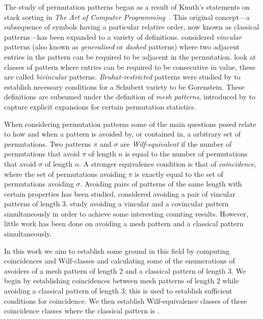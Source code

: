 The study of permutation patterns began as a result of Knuth's statements on
stack sorting in \emph{The Art of Computer Programming}~\cite[p.~243,
Ex.~5,6]{Knuth:1997:ACP:260999}. This original concept---a subsequence of
symbols having a particular relative order, now known as classical
patterns---has been expanded to a variety of definitions.
\textcite{babstein2000} considered \emph{vincular} patterns (also known as
\emph{generalised} or \emph{dashed} patterns) where two adjacent entries in the
pattern can be required to be adjacent in the permutation. \textcite{MR2652101}
look at classes of pattern where entries can be required to be consecutive in
value, these are called \emph{bivincular} patterns. \emph{Bruhat-restricted}
patterns were studied by \textcite{MR2264071} to establish necessary conditions
for a Schubert variety to be Gorenstein. These definitions are subsumed under
the definition of \emph{mesh patterns}, introduced by
\textcite{journals/combinatorics/BrandenC11} to capture explicit expansions for
certain permutation statistics.

When considering permutation patterns some of the main questions posed relate to
how and when a pattern is avoided by, or contained in, a arbitrary set of
permutations. Two patterns \(\pi\) and \(\sigma\) are \emph{Wilf-equivalent} if
the number of permutations that avoid \(\pi\) of length \(n\) is equal to the
number of permutations that avoid \(\sigma\) of length \(n\). A stronger
equivalence condition is that of \emph{coincidence}, where the set of
permutations avoiding \(\pi\) is exactly equal to the set of permutations
avoiding \(\sigma\). Avoiding pairs of patterns of the same length with certain
properties has been studied, \textcite{MR2178749} considered avoiding
a pair of vincular patterns of length 3. \textcite{2015arXiv151203226B} study
avoiding a vincular and a covincular pattern simultaneously in order to achieve
some interesting counting results. However, little work has been done on
avoiding a mesh pattern and a classical pattern simultaneously.

In this work we aim to establish some ground in this field by computing
coincidences and Wilf-classes and calculating some of the enumerations of
avoiders of a mesh pattern of length 2 and a classical pattern of length 3. We
begin by establishing coincidences between mesh patterns of length 2 while
avoiding a classical pattern of length 3; this is used to establish sufficient
conditions for coincidence. We then establish Wilf-equivalence classes of these
coincidence classes where the classical pattern is .
